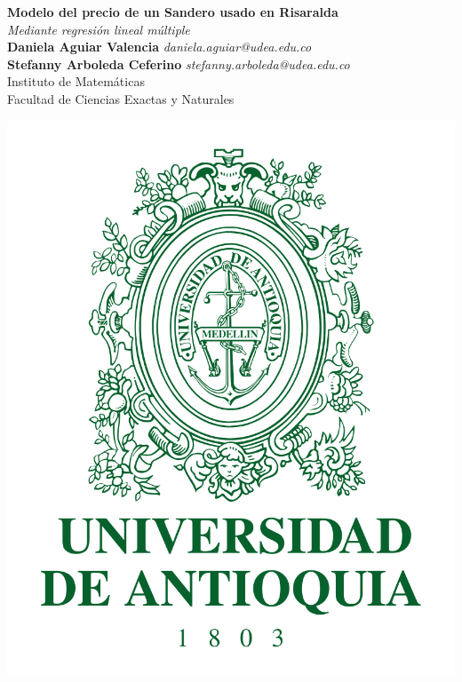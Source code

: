 \documentclass[12pt,a0,portrait]{a0poster}
\begin{document}

\begin{minipage}[b]{0.75\linewidth}
\Huge\textcolor{green(ncs)}{\textbf{\Huge Modelo del precio de un Sandero usado en Risaralda}} \\ 
\textcolor{gray-asparagus}{\textit{\Huge Mediante regresi\'on lineal m\'ultiple}}\\ [0.2cm] %
\textbf{\LARGE Daniela Aguiar Valencia} \textit{\large daniela.aguiar@udea.edu.co}\\
\textbf{\LARGE Stefanny Arboleda Ceferino} \textit{\large stefanny.arboleda@udea.edu.co}\\[0.5cm] %
\LARGE Instituto de Matem\'aticas \\Facultad de Ciencias Exactas y Naturales \\[0.4cm] %
	\end{minipage}
\begin{minipage}[b]{0.25\linewidth}
\includegraphics[scale=0.5]{logoudea}
\end{minipage}
\end{document}
